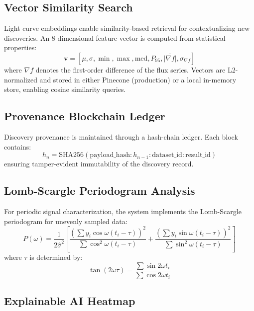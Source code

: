 \documentclass[conference]{IEEEtran}
\begin{document}
\subsection{Vector Similarity Search}

Light curve embeddings enable similarity-based retrieval for contextualizing new discoveries. An 8-dimensional feature vector is computed from statistical properties:
\begin{equation}
\mathbf{v} = [\mu, \sigma, \min, \max, \text{med}, P_{95}, \bar{|\nabla f|}, \sigma_{\nabla f}]
\end{equation}
where $\nabla f$ denotes the first-order difference of the flux series. Vectors are L2-normalized and stored in either Pinecone (production) or a local in-memory store, enabling cosine similarity queries.

\subsection{Provenance Blockchain Ledger}

Discovery provenance is maintained through a hash-chain ledger. Each block contains:
\begin{equation}
h_n = \text{SHA256}(\text{payload\_hash} : h_{n-1} : \text{dataset\_id} : \text{result\_id})
\end{equation}
ensuring tamper-evident immutability of the discovery record.

\subsection{Lomb-Scargle Periodogram Analysis}

For periodic signal characterization, the system implements the Lomb-Scargle periodogram for unevenly sampled data:
\begin{equation}
P(\omega) = \frac{1}{2\hat{\sigma}^2} \left[ \frac{\left(\sum y_i \cos\omega(t_i - \tau)\right)^2}{\sum \cos^2\omega(t_i - \tau)} + \frac{\left(\sum y_i \sin\omega(t_i - \tau)\right)^2}{\sum \sin^2\omega(t_i - \tau)} \right]
\end{equation}
where $\tau$ is determined by:
\begin{equation}
\tan(2\omega\tau) = \frac{\sum \sin 2\omega t_i}{\sum \cos 2\omega t_i}
\end{equation}

\subsection{Explainable AI Heatmap}
\end{document}
